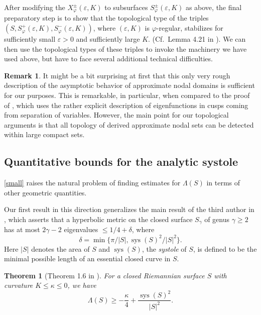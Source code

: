 \documentclass[a4paper,11pt]{amsart}
\numberwithin{equation}{section}
\newtheorem{thm}[equation]{Theorem}
\theoremstyle{definition}
\newtheorem{rem}[equation]{Remark}
\def\ve{\varepsilon}
\DeclareMathOperator{\sys}{sys}
\begin{document}
After modifying the $X_\varphi^{\pm}(\ve,K)$ to subsurfaces $S_\varphi^{\pm}(\ve,K)$ as above,
the final preparatory step is to show that the topological type of the triples $(S,S_\varphi^+(\ve,K),S_\varphi^-(\ve,K))$, where $(\ve,K)$ is $\varphi$-regular, stabilizes for sufficiently small $\ve>0$ and sufficiently large $K$.
(Cf.\ Lemma 4.21 in \cite{BMM2}).
We can then use the topological types of these triples to invoke the machinery we have used above, 
but have to face several additional technical difficulties.

\begin{rem}
It might be a bit surprising at first that this only very rough description of the asymptotic behavior of approximate nodal domains is sufficient for our purposes.
This is remarkable, in particular, when compared to the proof of \cite[Th{\'e}or{\`e}me 2]{OR}, which uses the rather explicit description of eigenfunctions in cusps coming from separation of variables.
However, the main point for our topological arguments is that all topology of derived approximate nodal sets can be detected within large compact sets.
\end{rem}

\subsection{Quantitative bounds for the analytic systole} \label{secas_quant}
\cref{small} raises the natural problem of finding estimates for $\Lambda(S)$ in terms of other geometric quantities.

Our first result in this direction generalizes the main result of the third author in \cite{Mo},
which asserts that a hyperbolic metric on the closed surface $S_\gamma$ of genus $\gamma \ge2$
has at most $2\gamma-2$ eigenvalues $\le1/4+\delta$, where
\begin{equation*}
  \delta = \min\{\pi/|S|,\sys(S)^2/|S|^2\}.
\end{equation*}
Here $|S|$ denotes the area of $S$ and $\sys(S)$, the \emph{systole} of $S$,
is defined to be the minimal possible length of an essential closed curve in $S$.

\begin{thm}[Theorem 1.6 in \cite{BMM3}]\label{main2}
For a closed Riemannian surface $S$ with curvature $K\le\kappa\le0$, we have
\begin{equation*}
  \Lambda(S) \ge -\frac{\kappa}4 + \frac{\sys(S)^2}{|S|^2}.
\end{equation*}
\end{thm}
\end{document}
